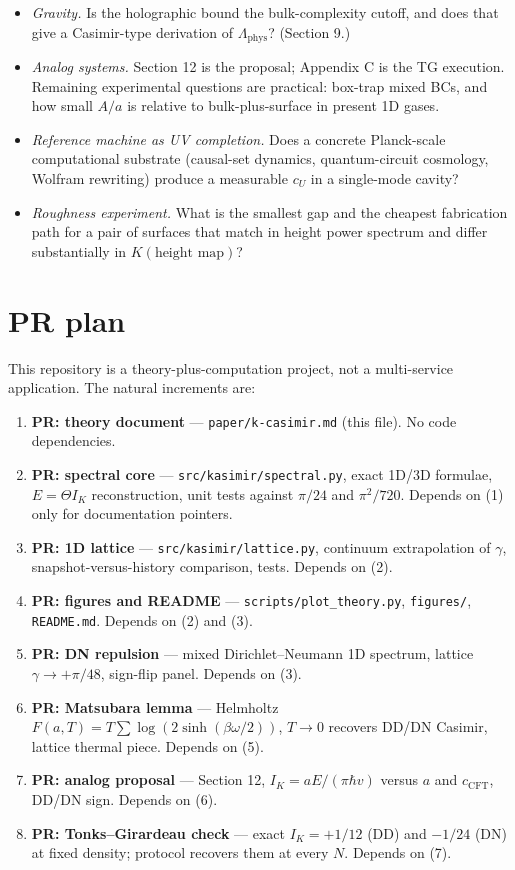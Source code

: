 \documentclass[11pt,letterpaper]{article}
\begin{document}
\begin{itemize}
\item \emph{Gravity.} Is the holographic bound the bulk-complexity cutoff, and does that give a Casimir-type derivation of \(\Lambda_{\mathrm{phys}}\)? (Section 9.)
\item \emph{Analog systems.} Section 12 is the proposal; Appendix C is the TG execution. Remaining experimental questions are practical: box-trap mixed BCs, and how small \(A/a\) is relative to bulk-plus-surface in present 1D gases.
\item \emph{Reference machine as UV completion.} Does a concrete Planck-scale computational substrate (causal-set dynamics, quantum-circuit cosmology, Wolfram rewriting) produce a measurable \(c_U\) in a single-mode cavity?
\item \emph{Roughness experiment.} What is the smallest gap and the cheapest fabrication path for a pair of surfaces that match in height power spectrum and differ substantially in \(K(\text{height map})\)?
\end{itemize}



\section*{PR plan}


This repository is a theory-plus-computation project, not a multi-service application. The natural increments are:


\begin{enumerate}
\item \textbf{PR: theory document} — \texttt{paper/k-casimir.md} (this file). No code dependencies.
\item \textbf{PR: spectral core} — \texttt{src/kasimir/spectral.py}, exact 1D/3D formulae, \(E=\Theta I_K\) reconstruction, unit tests against \(\pi/24\) and \(\pi^{2}/720\). Depends on (1) only for documentation pointers.
\item \textbf{PR: 1D lattice} — \texttt{src/kasimir/lattice.py}, continuum extrapolation of \(\gamma\), snapshot-versus-history comparison, tests. Depends on (2).
\item \textbf{PR: figures and README} — \texttt{scripts/plot\_theory.py}, \texttt{figures/}, \texttt{README.md}. Depends on (2) and (3).
\item \textbf{PR: DN repulsion} — mixed Dirichlet–Neumann 1D spectrum, lattice \(\gamma\to+\pi/48\), sign-flip panel. Depends on (3).
\item \textbf{PR: Matsubara lemma} — Helmholtz \(F(a,T)=T\sum\log(2\sinh(\beta\omega/2))\), \(T\to 0\) recovers DD/DN Casimir, lattice thermal piece. Depends on (5).
\item \textbf{PR: analog proposal} — Section 12, \(I_K=aE/(\pi\hbar v)\) versus \(a\) and \(c_{\mathrm{CFT}}\), DD/DN sign. Depends on (6).
\item \textbf{PR: Tonks–Girardeau check} — exact \(I_K=+1/12\) (DD) and \(-1/24\) (DN) at fixed density; protocol recovers them at every \(N\). Depends on (7).
\end{enumerate}
\end{document}
